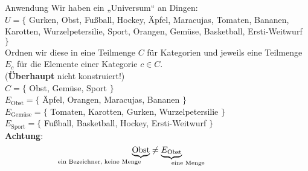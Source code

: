 \begin{frame}{Anwendung}
	Wir haben ein „Universum“ an Dingen:\\ 
	$U = \{ $ Gurken, Obst, Fußball, Hockey, Äpfel, Maracujas, Tomaten, Bananen, Karotten, Wurzelpetersilie, Sport,  Orangen, Gemüse, Basketball, Ersti-Weitwurf $ \} $  \\[0.5em]
	
	\pause
	Ordnen wir diese in eine Teilmenge $C$ für Kategorien und jeweils eine Teilmenge $E_c$ für die Elemente einer Kategorie $c \in C$. \\ {\small (\textbf{Überhaupt} nicht konstruiert!)} \\[0.5em]
	
	\pause
	$C = \{$ Obst, Gemüse, Sport $\}$ \\[0.3em]
	$E_{\text{Obst}} = \{$ Äpfel, Orangen, Maracujas, Bananen $\}$ \\
	$E_{\text{Gemüse}} = \{$ Tomaten, Karotten, Gurken, Wurzelpetersilie $\}$ \\
	$E_{\text{Sport}} = \{$ Fußball, Basketball, Hockey, Ersti-Weitwurf $\}$ \\
	
	\vspace{.5\baselineskip}
	\Large \alert{
			\textbf{Achtung}: 
			$$\underbrace{\text{Obst}}_{\mathllap{\text{ein Bezeichner, keine Menge}}}
			 \neq 
			\underbrace{E_{\text{Obst}}}_{\mathrlap{\text{eine Menge}}}$$
	}
	
\end{frame}


